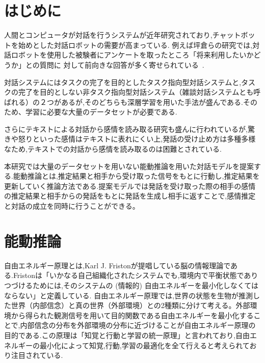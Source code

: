 \documentclass[a4j,10pt,uplatex]{jsarticle}
\makeatletter
\def\blfootnotetext{\xdef\@thefnmark{}\@footnotetext}
\makeatother
\begin{document}
\maketitle


\section{はじめに}
人間とコンピュータが対話を行うシステムが近年研究されており,チャットボットを始めとした対話ロボットの需要が高まっている.
例えば坪倉らの研究では,対話ロボットを使用した被験者にアンケートを取ったところ「将来利用したいかどうか」との質問に
対して前向きな回答が多く寄せられている~\cite{坪倉和哉2022}.

対話システムにはタスクの完了を目的としたタスク指向型対話システムと,タスクの完了を目的としない非タスク指向型対話システム（雑談対話システムとも呼ばれる）の２つがあるが,そのどちらも深層学習を用いた手法が盛んである.\cite{東中竜一郎2021}そのため、学習に必要な大量のデータセットが必要である.

さらにテキストによる対話から感情を読み取る研究も盛んに行われているが,驚きや怒りといった感情はテキストに表れにくい上,発話の受け止め方は多種多様なため,テキストでの対話から感情を読み取るのは困難とされている\cite{東中竜一郎2016}.

本研究では大量のデータセットを用いない能動推論を用いた対話モデルを提案する.能動推論とは,推定結果と相手から受け取った信号をもとに行動し,推定結果を更新していく推論方法である.提案モデルでは発話を受け取った際の相手の感情の推定結果と相手からの発話をもとに発話を生成し相手に返すことで,感情推定と対話の成立を同時に行うことができる。

\section{能動推論}
自由エネルギー原理とは,Karl J. Fristonが提唱している脳の情報理論である.Fristonは「いかなる自己組織化されたシステムでも,環境内で平衡状態でありつづけるためには,そのシステムの (情報的) 自由エネルギーを最小化しなくてはならない」と定義している.\cite{乾敏郎2019}
自由エネルギー原理では,世界の状態を生物が推測した世界（内部信念）と真の世界（外部環境）との2種類に分けて考える。外部環境から得られた観測信号を用いて目的関数である自由エネルギーを最小化することで,内部信念の分布を外部環境の分布に近づけることが自由エネルギー原理の目的である.この原理は「知覚と行動と学習の統一原理」と言われており,自由エネルギーの最小化によって知覚,行動,学習の最適化を全て行えると考えられており注目されている.
\end{document}
